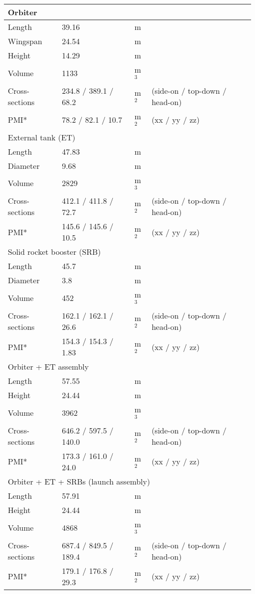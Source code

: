 \documentclass[Orbiter User Manual.tex]{subfiles}
\begin{document}
\begin{table}[H]
\centering
\begin{tabular}{|l|l|l|l|}
\hline
\multicolumn{4}{|l|}{\cellcolor{cyan!10}Orbiter}\\
\hline
Length & 39.16 & m & \\
\hline
Wingspan & 24.54 & m & \\
\hline
Height & 14.29 & m & \\
\hline
Volume & 1133 & m$^{3}$ & \\
\hline
Cross-sections & 234.8 / 389.1 / 68.2 & m$^{2}$ & (side-on / top-down / head-on)\\
\hline
PMI* & 78.2 / 82.1 / 10.7 & m$^{2}$ & (xx / yy / zz)\\
\hline
\multicolumn{4}{|l|}{\cellcolor{yellow!10}External tank (ET)}\\
\hline
Length & 47.83 & m & \\
\hline
Diameter & 9.68 & m & \\
\hline
Volume & 2829 & m$^{3}$ & \\
\hline
Cross-sections & 412.1 / 411.8 / 72.7 & m$^{2}$ & (side-on / top-down / head-on)\\
\hline
PMI* & 145.6 / 145.6 / 10.5 & m$^{2}$ & (xx / yy / zz)\\
\hline
\multicolumn{4}{|l|}{\cellcolor{cyan!10}Solid rocket booster (SRB)}\\
\hline
Length & 45.7 & m & \\
\hline
Diameter & 3.8 & m & \\
\hline
Volume & 452 & m$^{3}$ & \\
\hline
Cross-sections & 162.1 / 162.1 / 26.6 & m$^{2}$ & (side-on / top-down / head-on)\\
\hline
PMI* & 154.3 / 154.3 / 1.83 & m$^{2}$ & (xx / yy / zz)\\
\hline
\multicolumn{4}{|l|}{\cellcolor{yellow!10}Orbiter + ET assembly}\\
\hline
Length & 57.55 & m & \\
\hline
Height & 24.44 & m & \\
\hline
Volume & 3962 & m$^{3}$ & \\
\hline
Cross-sections & 646.2 / 597.5 / 140.0 & m$^{2}$ & (side-on / top-down / head-on)\\
\hline
PMI* & 173.3 / 161.0 / 24.0 & m$^{2}$ & (xx / yy / zz)\\
\hline
\multicolumn{4}{|l|}{\cellcolor{cyan!10}Orbiter + ET + SRBs (launch assembly)}\\
\hline
Length & 57.91 & m & \\
\hline
Height & 24.44 & m & \\
\hline
Volume & 4868 & m$^{3}$ & \\
\hline
Cross-sections & 687.4 / 849.5 / 189.4 & m$^{2}$ & (side-on / top-down / head-on)\\
\hline
PMI* & 179.1 / 176.8 / 29.3 & m$^{2}$ & (xx / yy / zz)\\
\hline
\end{tabular}
\end{table}
\end{document}
